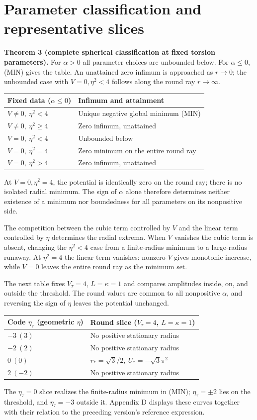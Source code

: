 \section{Parameter classification and representative slices}
\label{sec:revised7}

\textbf{Theorem 3 (complete spherical classification at fixed torsion parameters).} For $\alpha>0$ all parameter choices are unbounded below. For $\alpha\le0$, (MIN) gives the table. An unattained zero infimum is approached as $r\to0$; the unbounded case with $V=0,\eta^2<4$ follows along the round ray $r\to\infty$.
\begin{center}
\begin{tabularx}{\textwidth}{@{}p{}X@{}}
\toprule
Fixed data ($\alpha\le0$) & Infimum and attainment \\ \midrule
$V\ne0,\ \eta^2<4$ & Unique negative global minimum (MIN) \\
$V\ne0,\ \eta^2\ge4$ & Zero infimum, unattained \\
$V=0,\ \eta^2<4$ & Unbounded below \\
$V=0,\ \eta^2=4$ & Zero minimum on the entire round ray \\
$V=0,\ \eta^2>4$ & Zero infimum, unattained \\
\bottomrule
\end{tabularx}
\end{center}
At $V=0,\eta^2=4$, the potential is identically zero on the round ray; there is no isolated radial minimum. The sign of $\alpha$ alone therefore determines neither existence of a minimum nor boundedness for all parameters on its nonpositive side.

The competition between the cubic term controlled by $V$ and the linear term controlled by $\eta$ determines the radial extrema. When $V$ vanishes the cubic term is absent, changing the $\eta^2<4$ case from a finite-radius minimum to a large-radius runaway. At $\eta^2=4$ the linear term vanishes: nonzero $V$ gives monotonic increase, while $V=0$ leaves the entire round ray as the minimum set.

The next table fixes $V_\tau=4$, $L=\kappa=1$ and compares amplitudes inside, on, and outside the threshold. The round values are common to all nonpositive $\alpha$, and reversing the sign of $\eta$ leaves the potential unchanged.

\begin{center}
\begin{tabularx}{\textwidth}{@{}p{}X@{}}
\toprule
Code $\eta_\tau$ (geometric $\eta$) & Round slice ($V_\tau=4$, $L=\kappa=1$) \\ \midrule
$-3\ (3)$ & No positive stationary radius \\
$-2\ (2)$ & No positive stationary radius \\
$0\ (0)$ & $r_*=\sqrt3/2,\ U_*=-\sqrt3\pi^2$ \\
$2\ (-2)$ & No positive stationary radius \\
\bottomrule
\end{tabularx}
\end{center}

The $\eta_\tau=0$ slice realizes the finite-radius minimum in (MIN); $\eta_\tau=\pm2$ lies on the threshold, and $\eta_\tau=-3$ outside it. Appendix D displays these curves together with their relation to the preceding version's reference expression.
